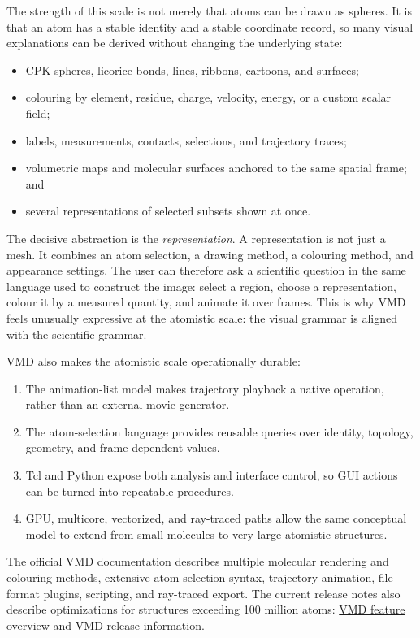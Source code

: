 \documentclass[11pt,a4paper]{article}
\begin{document}
The strength of this scale is not merely that atoms can be drawn as spheres.
It is that an atom has a stable identity and a stable coordinate record, so
many visual explanations can be derived without changing the underlying
state:

\begin{itemize}
  \item CPK spheres, licorice bonds, lines, ribbons, cartoons, and surfaces;
  \item colouring by element, residue, charge, velocity, energy, or a custom
        scalar field;
  \item labels, measurements, contacts, selections, and trajectory traces;
  \item volumetric maps and molecular surfaces anchored to the same spatial
        frame; and
  \item several representations of selected subsets shown at once.
\end{itemize}

The decisive abstraction is the \emph{representation}.  A representation is
not just a mesh.  It combines an atom selection, a drawing method, a colouring
method, and appearance settings.  The user can therefore ask a scientific
question in the same language used to construct the image: select a region,
choose a representation, colour it by a measured quantity, and animate it
over frames.  This is why VMD feels unusually expressive at the atomistic
scale: the visual grammar is aligned with the scientific grammar.

VMD also makes the atomistic scale operationally durable:

\begin{enumerate}
  \item The animation-list model makes trajectory playback a native operation,
        rather than an external movie generator.
  \item The atom-selection language provides reusable queries over identity,
        topology, geometry, and frame-dependent values.
  \item Tcl and Python expose both analysis and interface control, so GUI
        actions can be turned into repeatable procedures.
  \item GPU, multicore, vectorized, and ray-traced paths allow the same
        conceptual model to extend from small molecules to very large
        atomistic structures.
\end{enumerate}

The official VMD documentation describes multiple molecular rendering and
colouring methods, extensive atom selection syntax, trajectory animation,
file-format plugins, scripting, and ray-traced export.  The current release
notes also describe optimizations for structures exceeding 100 million atoms:
\href{https://www.ks.uiuc.edu/Research/vmd/allversions/what_is_vmd.html}{VMD
feature overview} and
\href{https://www.ks.uiuc.edu/Research/vmd/current/}{VMD release information}.
\end{document}
